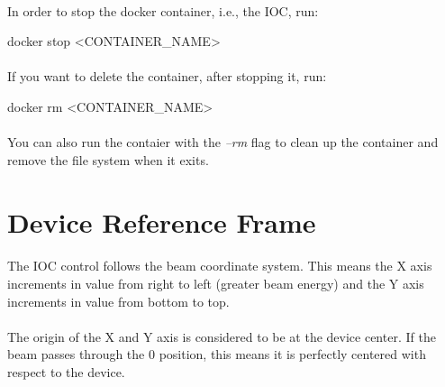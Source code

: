 \documentclass[openany]{article}
\begin{document}
        \paragraph{} In order to stop the docker container, i.e., the IOC, run:

        \vspace{1mm}
        \begin{code}
docker stop <CONTAINER_NAME>
        \end{code}
        \vspace{1mm}

        \paragraph{} If you want to delete the container, after stopping it, run:

        \vspace{1mm}
        \begin{code}
docker rm <CONTAINER_NAME>
        \end{code}
        \vspace{1mm}

        \paragraph{} You can also run the contaier with the \emph{--rm} flag to clean up the container and remove the file system when it exits.

\section{Device Reference Frame}\label{sec:dev-reference-frame}

    \paragraph{} The IOC control follows the beam coordinate system. This means the X axis increments in value from right to left (greater beam energy) and the Y axis increments in value from bottom to top.

    \paragraph{} The origin of the X and Y axis is considered to be at the device center. If the beam passes through the 0 position, this means it is perfectly centered with respect to the device.
\end{document}
